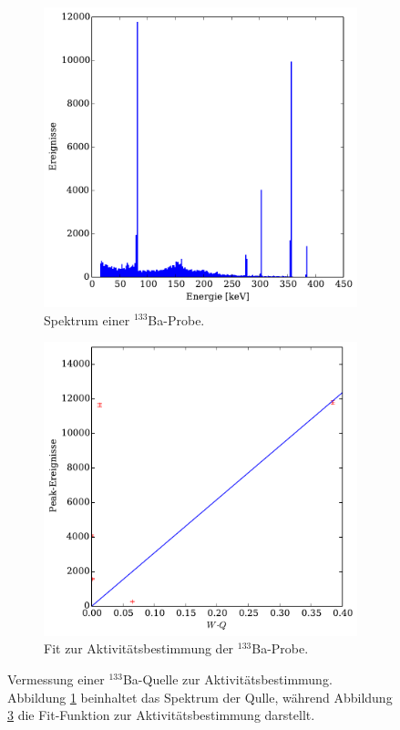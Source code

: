 \begin{figure}
    \centering
    \begin{subfigure}{0.49\linewidth}
        \includegraphics[width=1.\linewidth]{img/07_barium.pdf}
        \caption{
            Spektrum einer $^{133}$Ba-Probe.
        }
        \label{fig:ba_spektrum}
    \end{subfigure}
    \begin{subfigure}{0.49\linewidth}
        \includegraphics[width=1.\linewidth]{img/07_barium_activity.pdf}
        \caption{
            Fit zur Aktivitätsbestimmung der $^{133}$Ba-Probe.
        }
        \label{fig:barium_aktivitaet}
    \end{subfigure}
    \caption{
        Vermessung einer $^{133}$Ba-Quelle zur Aktivitätsbestimmung. Abbildung
        \ref{fig:ba_spektrum} beinhaltet das Spektrum der Qulle, während
        Abbildung \ref{fig:barium_aktivitaet} die Fit-Funktion zur Aktivitätsbestimmung
        darstellt.
    }
\end{figure}
